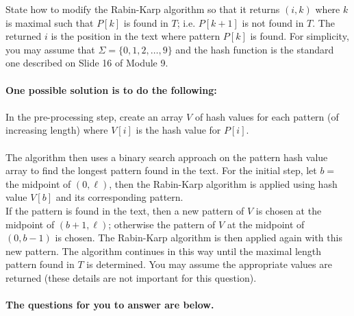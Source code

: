 \documentclass[12pt]{article}
\begin{document}
	State how to modify the Rabin-Karp algorithm so that it returns $(i,k)$ where $k$ is maximal such that $P[k]$ is found in $T$; i.e. $P[k+1]$ is not found in $T$. 
	The returned $i$ is the position in the text where pattern $P[k]$ is found.
	For simplicity, you may assume that $\Sigma = \{0, 1, 2, \ldots, 9\}$ and the hash function is the standard one described on Slide 16 of Module 9. \\
	~\\
	\textbf{One possible solution is to do the following:} \\
	~\\
	In the pre-processing step, create an array $V$ of hash values for each pattern (of increasing length) where $V[i]$ is the hash value for $P[i]$. \\
	~\\
	The algorithm then uses a binary search approach on the pattern hash value array to find the longest pattern found in the text.  
	For the initial step, let $b =$ the midpoint of $(0, \ell)$, then the Rabin-Karp algorithm is applied using hash value $V[b]$ and its corresponding pattern. \\
	If the pattern is found in the text, then a new pattern of $V$ is chosen at the midpoint of $(b+1, \ell)$;
	otherwise the pattern of $V$ at the midpoint of $(0, b-1)$ is chosen.  
	The Rabin-Karp algorithm is then applied again with this new pattern.
	The algorithm continues in this way until the maximal length pattern found in $T$ is determined.
	You may assume the appropriate values are returned (these details are not important for this question). \\
	~\\
	\textbf{The questions for you to answer are below.}
	
\end{document}
